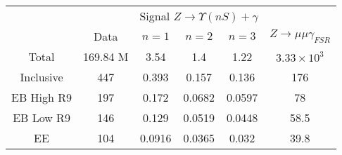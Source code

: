 

\begin{tabular}{c|c|c|c|c|c}
\hline
\hline

&  &  \multicolumn{3}{c|}{Signal $Z \rightarrow \Upsilon(nS)+\gamma$} &    \\
\cline{3-5}
& Data & $n=1$ & $n=2$ & $n=3$ &  $Z \rightarrow \mu\mu\gamma_{FSR}$  \\
\hline
Total & 169.84 M &  3.54 & 1.4 & 1.22 & $3.33 \times 10^{3}$  \\
\hline\hline
Inclusive & 447  &  0.393 &  0.157 &  0.136 &  176  \\
EB High R9 & 197  &  0.172 &  0.0682 &  0.0597 &  78  \\
EB Low R9 & 146  &  0.129 &  0.0519 &  0.0448 &  58.5  \\
EE & 104  &  0.0916 &  0.0365 &  0.032 &  39.8 \\

\end{tabular}

